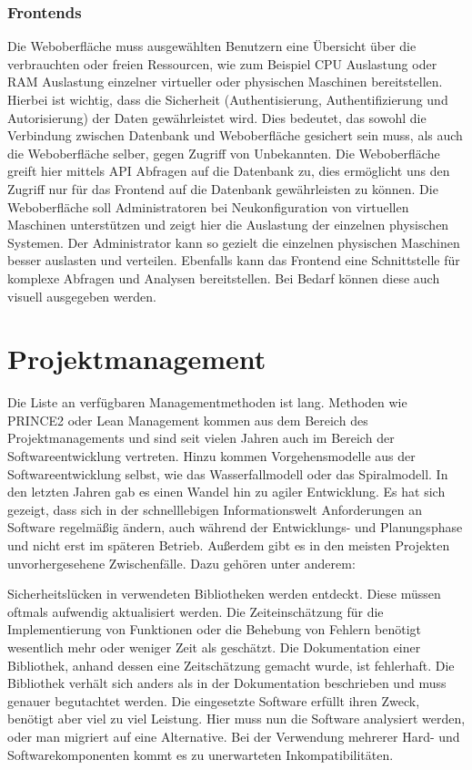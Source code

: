 \subsection{Frontends}
Die Weboberfläche muss ausgewählten Benutzern eine Übersicht über die
verbrauchten oder freien Ressourcen, wie zum Beispiel CPU Auslastung oder RAM
Auslastung einzelner virtueller oder physischen Maschinen bereitstellen.
Hierbei ist wichtig, dass die Sicherheit (Authentisierung, Authentifizierung
und Autorisierung) der Daten gewährleistet wird. Dies bedeutet, das sowohl die
Verbindung zwischen Datenbank und Weboberfläche gesichert sein muss, als auch
die Weboberfläche selber, gegen Zugriff von Unbekannten. Die Weboberfläche
greift hier mittels API Abfragen auf die Datenbank zu, dies ermöglicht uns den
Zugriff nur für das Frontend auf die Datenbank gewährleisten zu können.  Die
Weboberfläche soll Administratoren bei Neukonfiguration von virtuellen
Maschinen unterstützen und zeigt hier die Auslastung der einzelnen physischen
Systemen. Der Administrator kann so gezielt die einzelnen physischen Maschinen
besser auslasten und verteilen. Ebenfalls kann das Frontend eine Schnittstelle
für komplexe Abfragen und Analysen bereitstellen. Bei Bedarf können diese auch
visuell ausgegeben werden.
\mr%

\chapter{Projektmanagement}
Die Liste an verfügbaren Managementmethoden ist lang. Methoden wie PRINCE2 oder
Lean Management kommen aus dem Bereich des Projektmanagements und sind seit
vielen Jahren auch im Bereich der Softwareentwicklung vertreten. Hinzu kommen
Vorgehensmodelle aus der Softwareentwicklung selbst, wie das Wasserfallmodell
oder das Spiralmodell. In den letzten Jahren gab es einen Wandel hin zu agiler
Entwicklung. Es hat sich gezeigt, dass sich in der schnelllebigen
Informationswelt Anforderungen an Software regelmäßig ändern, auch während der
Entwicklungs- und Planungsphase und nicht erst im späteren Betrieb. Außerdem
gibt es in den meisten Projekten unvorhergesehene Zwischenfälle. Dazu gehören
unter anderem:

\begin{outline}
  \1 Sicherheitslücken in verwendeten Bibliotheken werden entdeckt. Diese
  müssen oftmals aufwendig aktualisiert werden.
  \1 Die Zeiteinschätzung für die Implementierung von Funktionen oder die
  Behebung von Fehlern benötigt wesentlich mehr oder weniger Zeit als
  geschätzt.
  \1 Die Dokumentation einer Bibliothek, anhand dessen eine Zeitschätzung
  gemacht wurde, ist fehlerhaft. Die Bibliothek verhält sich anders als in der
  Dokumentation beschrieben und muss genauer begutachtet werden.
  \1 Die eingesetzte Software erfüllt ihren Zweck, benötigt aber viel zu viel
  Leistung. Hier muss nun die Software analysiert werden, oder man migriert auf
  eine Alternative.
  \1 Bei der Verwendung mehrerer Hard- und Softwarekomponenten kommt es zu
  unerwarteten Inkompatibilitäten.
\end{outline}

